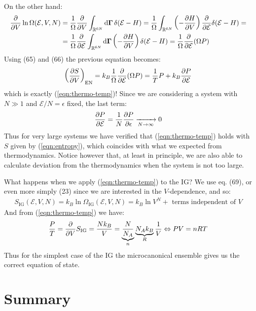 \documentclass[../template.tex]{subfiles}
\begin{document}
On the other hand:
\begin{align*}
    \pdv{V} \ln \Omega(\mathcal{E}, V, N) &= \frac{1}{\Omega} \pdv{V} \int_{\mathbb{R}^{6N}} \dd{\bm{\Gamma}} \delta(\mathcal{E}- H) = \frac{1}{\Omega} \int_{\mathbb{R}^{6N}} \left(-\pdv{H}{V}\right) \pdv{\mathcal{E}} \delta(\mathcal{E}-H) =\\
    &= \frac{1}{\Omega} \pdv{\mathcal{E}} \int_{\mathbb{R}^{6N}} \dd{\bm{\Gamma}} \left(-\pdv{H}{V}\right) \delta(\mathcal{E}-H) = \frac{1}{\Omega} \pdv{\mathcal{E}}(\Omega P) 
\end{align*}
Using (65) and (66) the previous equation becomes:
\begin{align*}
    \left(\pdv{S}{V}\right)_{\mathrm{EN}} = k_B \frac{1}{\Omega} \pdv{\mathcal{E}}(\Omega P) = \frac{1}{T} P + k_B \pdv{P}{\mathcal{E}}  
\end{align*}
which is exactly (\ref{eqn:thermo-temp})! Since we are considering a system with $N \gg 1$ and $\mathcal{E}/N = \epsilon$ fixed, the last term:
\begin{align*}
    \pdv{P}{\mathcal{E}} = \frac{1}{N} \pdv{P}{\epsilon}  \xrightarrow[N \to \infty]{}  0
\end{align*}
Thus for very large systems we have verified that (\ref{eqn:thermo-temp}) holds with $S$ given by (\ref{eqn:entropy}), which coincides with what we expected from thermodynamics. Notice however that, at least in principle, we are also able to calculate deviation from the thermodynamics when the system is not too large.

\medskip

What happens when we apply (\ref{eqn:thermo-temp}) to the IG? We use eq. (69), or even more simply (23) since we are interested in the $V$-dependence, and so:
\begin{align*}
    S_{\mathrm{IG}}(\mathcal{E}, V, N) = k_B \ln \Omega_{\mathrm{IG}} (\mathcal{E}, V, N) = k_B \ln V^N + \text{ terms independent of $V$}
\end{align*}
And from (\ref{eqn:thermo-temp}) we have:
\begin{align*}
    \frac{P}{T} = \pdv{V} S_{\mathrm{IG}} = \frac{N k_B}{V} = \underbrace{\frac{N}{N_A}}_{n} \underbrace{ N_A k_B}_{R}  \frac{1}{V} \Leftrightarrow PV = nRT
\end{align*}
Thus for the simplest case of the IG the microcanonical ensemble gives us the correct equation of state.

\section{Summary}
\end{document}
